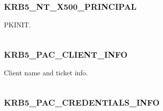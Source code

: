\documentclass[letterpaper,10pt,english]{sphinxmanual}
\begin{document}
\subsubsection{KRB5\_NT\_X500\_PRINCIPAL}
\label{appdev/refs/macros/KRB5_NT_X500_PRINCIPAL:krb5-nt-x500-principal-data}\label{appdev/refs/macros/KRB5_NT_X500_PRINCIPAL::doc}\label{appdev/refs/macros/KRB5_NT_X500_PRINCIPAL:krb5-nt-x500-principal}

\begin{fulllineitems}
\label{appdev/refs/macros/KRB5_NT_X500_PRINCIPAL:KRB5_NT_X500_PRINCIPAL}
\end{fulllineitems}


PKINIT.

\begin{tabulary}{\linewidth}{|L|L|}
\hline

 & 
\\
\hline\end{tabulary}



\subsubsection{KRB5\_PAC\_CLIENT\_INFO}
\label{appdev/refs/macros/KRB5_PAC_CLIENT_INFO:krb5-pac-client-info}\label{appdev/refs/macros/KRB5_PAC_CLIENT_INFO::doc}\label{appdev/refs/macros/KRB5_PAC_CLIENT_INFO:krb5-pac-client-info-data}

\begin{fulllineitems}
\label{appdev/refs/macros/KRB5_PAC_CLIENT_INFO:KRB5_PAC_CLIENT_INFO}
\end{fulllineitems}


Client name and ticket info.

\begin{tabulary}{\linewidth}{|L|L|}
\hline

 & 
\\
\hline\end{tabulary}



\subsubsection{KRB5\_PAC\_CREDENTIALS\_INFO}
\label{appdev/refs/macros/KRB5_PAC_CREDENTIALS_INFO::doc}\label{appdev/refs/macros/KRB5_PAC_CREDENTIALS_INFO:krb5-pac-credentials-info}\label{appdev/refs/macros/KRB5_PAC_CREDENTIALS_INFO:krb5-pac-credentials-info-data}
\end{document}
